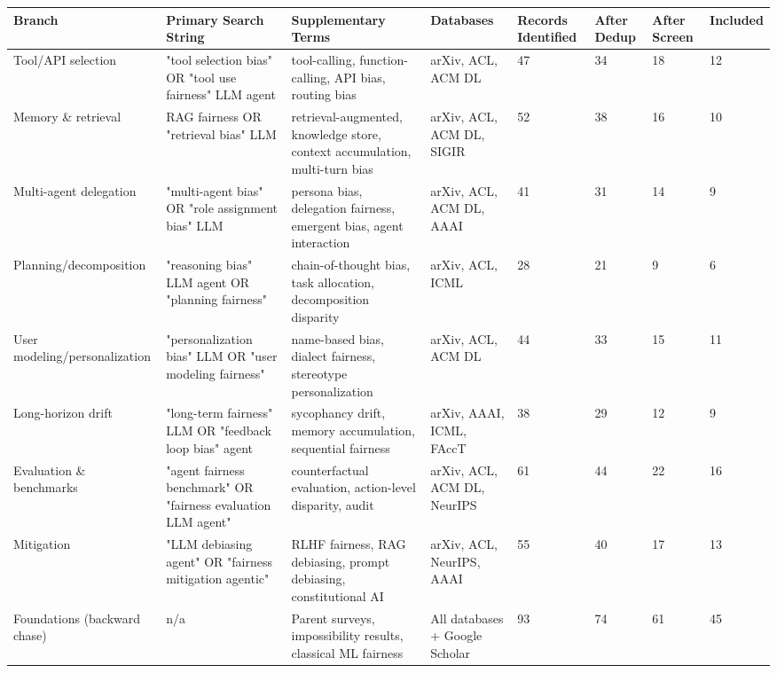 \documentclass[10pt]{article}
\begin{document}
\begin{center}\footnotesize
\begin{longtable}{|p{}|p{}|p{}|p{}|p{}|p{}|p{}|p{}|}
\hline \textbf{Branch} & \textbf{Primary Search String} & \textbf{Supplementary Terms} & \textbf{Databases} & \textbf{Records Identified} & \textbf{After Dedup} & \textbf{After Screen} & \textbf{Included} \\ \hline\endhead
Tool/API selection & "tool selection bias" OR "tool use fairness" LLM agent & tool-calling, function-calling, API bias, routing bias & arXiv, ACL, ACM DL & 47 & 34 & 18 & 12 \\ \hline
Memory \& retrieval & RAG fairness OR "retrieval bias" LLM & retrieval-augmented, knowledge store, context accumulation, multi-turn bias & arXiv, ACL, ACM DL, SIGIR & 52 & 38 & 16 & 10 \\ \hline
Multi-agent delegation & "multi-agent bias" OR "role assignment bias" LLM & persona bias, delegation fairness, emergent bias, agent interaction & arXiv, ACL, ACM DL, AAAI & 41 & 31 & 14 & 9 \\ \hline
Planning/decomposition & "reasoning bias" LLM agent OR "planning fairness" & chain-of-thought bias, task allocation, decomposition disparity & arXiv, ACL, ICML & 28 & 21 & 9 & 6 \\ \hline
User modeling/personalization & "personalization bias" LLM OR "user modeling fairness" & name-based bias, dialect fairness, stereotype personalization & arXiv, ACL, ACM DL & 44 & 33 & 15 & 11 \\ \hline
Long-horizon drift & "long-term fairness" LLM OR "feedback loop bias" agent & sycophancy drift, memory accumulation, sequential fairness & arXiv, AAAI, ICML, FAccT & 38 & 29 & 12 & 9 \\ \hline
Evaluation \& benchmarks & "agent fairness benchmark" OR "fairness evaluation LLM agent" & counterfactual evaluation, action-level disparity, audit & arXiv, ACL, ACM DL, NeurIPS & 61 & 44 & 22 & 16 \\ \hline
Mitigation & "LLM debiasing agent" OR "fairness mitigation agentic" & RLHF fairness, RAG debiasing, prompt debiasing, constitutional AI & arXiv, ACL, NeurIPS, AAAI & 55 & 40 & 17 & 13 \\ \hline
Foundations (backward chase) & n/a & Parent surveys, impossibility results, classical ML fairness & All databases + Google Scholar & 93 & 74 & 61 & 45 \\ \hline

\end{longtable}
\end{center}
\end{document}
